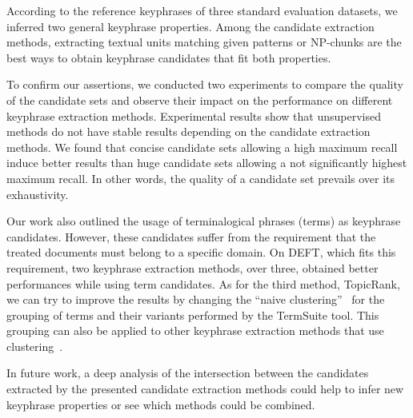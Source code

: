   According to the reference keyphrases of three standard evaluation datasets,
  we inferred two general keyphrase properties. Among the candidate extraction
  methods, extracting textual units matching given patterns or NP-chunks are the
  best ways to obtain keyphrase candidates that fit both properties.

  To confirm our assertions, we conducted two experiments to compare the quality
  of the candidate sets and observe their impact on
  the performance on different keyphrase extraction methods. Experimental
  results show that unsupervised methods do not have stable results depending on
  the candidate extraction methods. We found that concise candidate sets
  allowing a high maximum recall induce better results than huge candidate sets
  allowing a not significantly highest maximum recall. In other words, the
  quality of a candidate set prevails over its exhaustivity.

  Our work also outlined the usage of terminalogical phrases (terms) as
  keyphrase candidates. However, these candidates suffer from the requirement
  that the treated documents must belong to a specific domain. On DEFT, which
  fits this requirement, two keyphrase extraction methods, over three, obtained
  better performances while using term candidates. As for the third method,
  TopicRank, we can try to improve the results by changing the ``naive
  clustering''~\cite{bougouin2013topicrank} for the grouping of terms and their
  variants performed by the TermSuite tool. This grouping can also be applied to
  other keyphrase extraction methods that use
  clustering~\cite{matsuo2004wordcooccurrence}.

  In future work, a deep analysis of the intersection between the candidates
  extracted by the presented candidate extraction methods could help to infer
  new keyphrase properties or see which methods could be combined.

